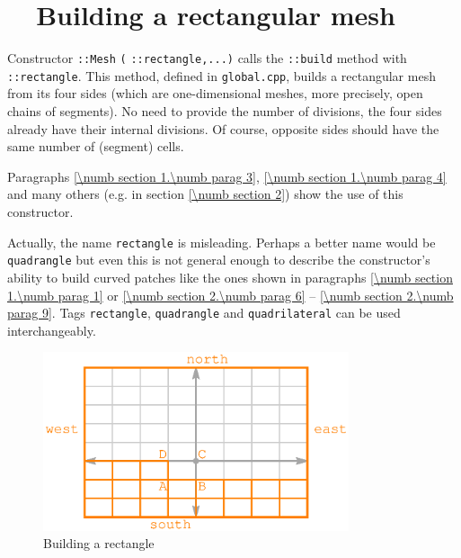 \section{~~Building a rectangular mesh}\label{\numb section 12.\numb parag 3}

Constructor {\small\tt {}::Mesh} {\small\tt(} {\small\tt{}::rectangle,...)}
calls the {\small\tt{}::build} method with {\small\tt {}::rectangle}.
This method, defined in {\small\tt global.cpp}, builds a rectangular mesh from its
four sides (which are one-dimensional meshes, more precisely, open chains of segments).
No need to provide the number of divisions, the four sides already have their internal divisions.
Of course, opposite sides should have the same number of (segment) cells.

Paragraphs \ref{\numb section 1.\numb parag 3}, \ref{\numb section 1.\numb parag 4} and
many others (e.g. in section \ref{\numb section 2}) show the use of this constructor.

Actually, the name {\small\tt rectangle} is misleading.
Perhaps a better name would be {\small\tt quadrangle} but even this is not general enough to
describe the constructor's ability to build curved patches like the ones shown in paragraphs
\ref{\numb section 1.\numb parag 1} or \ref{\numb section 2.\numb parag 6} --
\ref{\numb section 2.\numb parag 9}.
Tags {\small\tt rectangle}, {\small\tt quadrangle} and {\small\tt quadrilateral} can be used
interchangeably.

\begin{figure}[ht] \centering
  \includegraphics[width=90mm]{fig-rectangle}
  \caption{Building a rectangle}
  \label{\numb section 12.\numb fig 1}
\end{figure}

